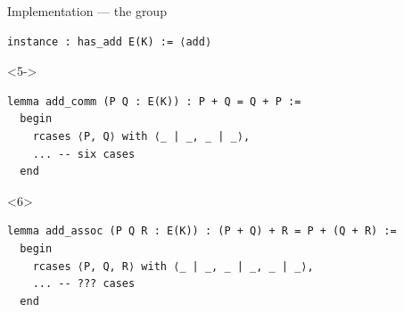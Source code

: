 \documentclass[10pt]{beamer}
\begin{document}
\begin{frame}[fragile, t]{Implementation --- the group}
\begin{onlyenv}
\begin{lstlisting}[basicstyle=\scriptsize, frame=single]
instance : has_add E(K) := ⟨add⟩
\end{lstlisting}
\end{onlyenv}


\begin{onlyenv}<5->
\begin{lstlisting}[basicstyle=\scriptsize, frame=single]
lemma add_comm (P Q : E(K)) : P + Q = Q + P :=
  begin
    rcases ⟨P, Q⟩ with ⟨_ | _, _ | _⟩,
    ... -- six cases
  end
\end{lstlisting}
\end{onlyenv}


\begin{onlyenv}<6>
\begin{lstlisting}[basicstyle=\scriptsize, frame=single]
lemma add_assoc (P Q R : E(K)) : (P + Q) + R = P + (Q + R) :=
  begin
    rcases ⟨P, Q, R⟩ with ⟨_ | _, _ | _, _ | _⟩,
    ... -- ??? cases
  end
\end{lstlisting}
\end{onlyenv}

\end{frame}
\end{document}
